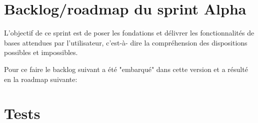 \section{Backlog/roadmap du sprint Alpha}

L’objectif de ce sprint est de poser les fondations et délivrer les fonctionnalités de bases attendues par l’utilisateur, 
c'est-à- dire la compréhension des dispositions possibles et impossibles.

Pour ce faire le backlog suivant a été "embarqué" dans cette version et a résulté en la roadmap suivante:


\section{Tests}


